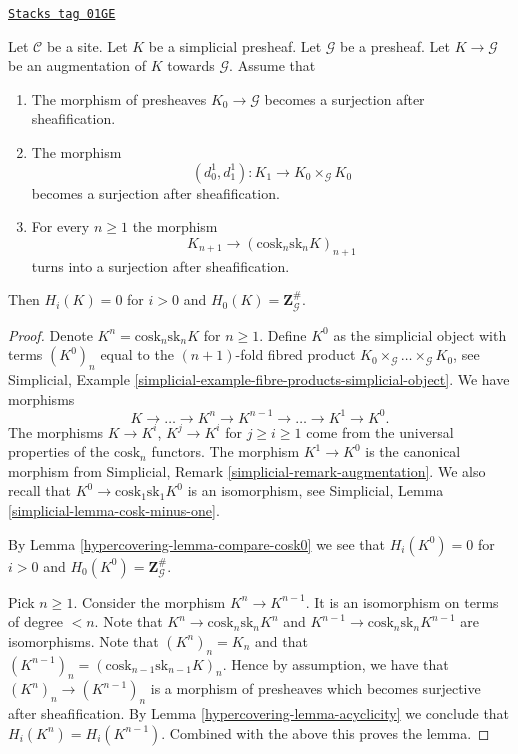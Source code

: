 \begin{lemma}
\label{hypercovering-lemma-acyclic-hypercover-sheaves}
\href{https://stacks.math.columbia.edu/tag/01GE}{\texttt{Stacks tag 01GE}}

Let $\mathcal{C}$ be a site.
Let $K$ be a simplicial presheaf.
Let $\mathcal{G}$ be a presheaf.
Let $K \to \mathcal{G}$ be an augmentation of $K$
towards $\mathcal{G}$. Assume that
\begin{enumerate}
\item The morphism of presheaves $K_0 \to \mathcal{G}$ becomes
a surjection after sheafification.
\item The morphism
$$
(d^1_0, d^1_1) :
K_1
\longrightarrow
K_0 \times_\mathcal{G} K_0
$$
becomes a surjection after sheafification.
\item For every $n \geq 1$ the morphism
$$
K_{n + 1} \longrightarrow (\text{cosk}_n \text{sk}_n K)_{n + 1}
$$
turns into a surjection after sheafification.
\end{enumerate}
Then $H_i(K) = 0$ for $i > 0$ and
$H_0(K) = \mathbf{Z}_\mathcal{G}^\#$.
\end{lemma}

\begin{proof}

Denote $K^n = \text{cosk}_n \text{sk}_n K$ for $n \geq 1$.
Define $K^0$ as the simplicial object with terms
$(K^0)_n$ equal to the $(n + 1)$-fold fibred product
$K_0 \times_\mathcal{G} \ldots \times_\mathcal{G} K_0$,
see Simplicial,
Example \ref{simplicial-example-fibre-products-simplicial-object}.
We have morphisms
$$
K \longrightarrow \ldots \to K^n \to K^{n - 1} \to \ldots \to K^1 \to K^0.
$$
The morphisms $K \to K^i$, $K^j \to K^i$ for $j \geq i \geq 1$ come
from the universal properties of the $\text{cosk}_n$ functors.
The morphism $K^1 \to K^0$ is the canonical morphism
from
Simplicial, Remark \ref{simplicial-remark-augmentation}.
We also recall that $K^0 \to \text{cosk}_1 \text{sk}_1 K^0$
is an isomorphism, see
Simplicial, Lemma \ref{simplicial-lemma-cosk-minus-one}.

\medskip\noindent
By Lemma \ref{hypercovering-lemma-compare-cosk0} we see that
$H_i(K^0) = 0$ for $i > 0$ and $H_0(K^0) = \mathbf{Z}_\mathcal{G}^\#$.

\medskip\noindent
Pick $n \geq 1$. Consider the morphism $K^n \to K^{n - 1}$.
It is an isomorphism on terms of degree $< n$.
Note that $K^n \to \text{cosk}_n \text{sk}_n K^n$ and
$K^{n - 1} \to \text{cosk}_n \text{sk}_n K^{n - 1}$
are isomorphisms. Note that $(K^n)_n = K_n$ and
that $(K^{n - 1})_n = (\text{cosk}_{n - 1} \text{sk}_{n - 1} K)_n$.
Hence by assumption, we have that $(K^n)_n \to (K^{n - 1})_n$
is a morphism of presheaves which becomes surjective after
sheafification. By Lemma \ref{hypercovering-lemma-acyclicity} we conclude that
$H_i(K^n) = H_i(K^{n - 1})$.
Combined with the above this proves the lemma.
\end{proof}

